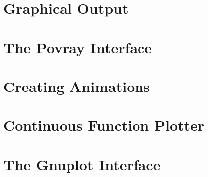 

\section{Graphical Output}
\label{sec:draw}






\bigskip

\clearpage





\section{The Povray Interface}
\label{sec:povray}







\bigskip
\clearpage




\section{Creating Animations}
\label{sec:animations}






\bigskip

\clearpage






\section{Continuous Function Plotter}
\label{sec:function:plotter}






\bigskip

\clearpage

\section{The Gnuplot Interface}
\label{sec:gnuplot:interface}







\bigskip
\clearpage

